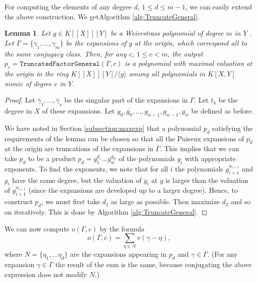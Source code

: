\documentclass[a4paper,11pt]{amsart}%
\theoremstyle{definition}
\theoremstyle{plain}
\newtheorem{lemma}[defn]{Lemma}
\theoremstyle{remark}
\begin{document}
For computing the elements of any degree $d$, $1 \le d \le m-1$, we can easily extend the above construction. We getAlgorithm \ref{alg:TruncateGeneral}.

\begin{lemma}
\label{lemma int bas shape}
Let $g \in K[[X]][Y]$ be a Weierstrass polynomial of degree $m$ in $Y$ . 
Let $\varGamma = \{\gamma_{1}, \dots, \gamma_{m}\}$ be the expansions
of $g$ at the origin, which correspond all to the same conjugacy class. Then, for
any $c$, $1 \le c < m$, the output $p_{c} = \mathtt{TruncatedFactorGeneral}(\varGamma,
c)$ is a polynomial with maximal valuation at the origin in the ring
$K[[X]][Y]/\langle g \rangle$ among all polynomials in $K[X,Y]$ monic of degree
$c$ in $Y$.
\end{lemma}

\begin{proof}
Let $\bar\gamma_{1}, \dots, \bar\gamma_{s}$ be the singular part of the
expansions in $\varGamma$. Let $t_{k}$ be the degree in $X$ of these
expansions. Let $g_{0}, \overline{g_{0}}, \dots, g_{w-1}, \overline{g_{w-1}},
g_{w}$ be defined as before.

We have noted in Section \ref{subsection:maxexp} that a polynomial $p_{d}$ satisfying the requirements of the
lemma can be chosen so that all the Puiseux expansions of $p_{d}$ at the
origin are truncations of the expansions in $\varGamma$. This implies that we
can take $p_{d}$ to be a product $p_{d} = g_{1}^{d_{1}} \dots g_{w}^{d_{w}}$
of the polynomials $g_{i}$ with appropriate exponents. To find the exponents,
we note that for all $i$ the polynomials $g_{i+1}^{u_{i+1}}$ and $g_{i}$ have
the same degree, but the valuation of $g_{i}$ at $g$ is larger than the
valuation of $g_{i+1}^{u_{i+1}}$ (since the expansions are developed up to a
larger degree). Hence, to construct $p_{d}$, we must first take $d_{1}$ as
large as possible. Then maximize $d_{2}$ and so on iteratively. This is done
by Algorithm \ref{alg:TruncateGeneral}.
\end{proof}

We can now compute $o(\varGamma, c)$ by the formula
\[
o(\varGamma, c) = \sum_{\eta\in N} v(\gamma- \eta),
\]
where $N = \{\eta_{1}, \dots\eta_{d}\}$ are the expansions appearing in
$p_{d}$ and $\gamma\in\varGamma$. (For any expansion $\gamma\in\varGamma$ the
result of the sum is the same, because conjugating the above expression does
not modify $N$.)
\end{document}
